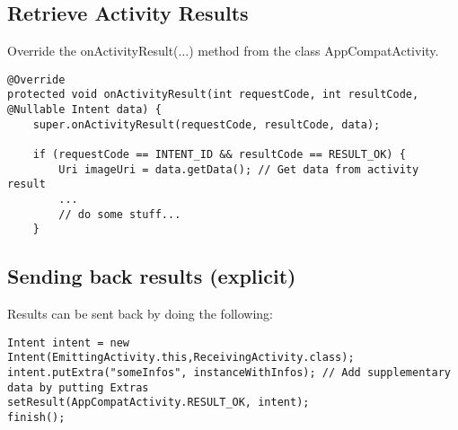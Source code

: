 \documentclass[11pt]{article}
\begin{document}
\subsection{Retrieve Activity Results}
Override the onActivityResult(...) method from the class AppCompatActivity. 
\lstset{language = Java}
\begin{lstlisting}
@Override
protected void onActivityResult(int requestCode, int resultCode, @Nullable Intent data) {
    super.onActivityResult(requestCode, resultCode, data);

    if (requestCode == INTENT_ID && resultCode == RESULT_OK) {
        Uri imageUri = data.getData(); // Get data from activity result
        ...
        // do some stuff...
    }
\end{lstlisting}

\subsection{Sending back results (explicit)}
Results can be sent back by doing the following: 
\lstset{language = Java}
\begin{lstlisting}
Intent intent = new Intent(EmittingActivity.this,ReceivingActivity.class);
intent.putExtra("someInfos", instanceWithInfos); // Add supplementary data by putting Extras
setResult(AppCompatActivity.RESULT_OK, intent);
finish();
\end{lstlisting}
\end{document}
